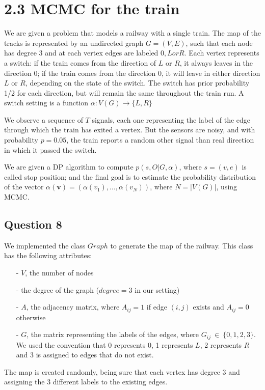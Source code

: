 \documentclass[]{article}
\begin{document}
\section*{2.3 MCMC for the train}
We are given a problem that models a railway with a single train. The map of the tracks is represented by an undirected graph $G=(V,E)$, such that each node has degree 3 and at each vertex edges are labeled $0, L or R$. Each vertex represents a switch: if the train comes from the direction of $L$ or $R$, it always leaves in the direction 0; if the train comes from the direction $0$, it will leave in either direction $L$ or $R$, depending on the state of the switch. The switch has prior probability 1/2 for each direction, but will remain the same throughout the train run. A switch setting is a function $\alpha : V(G) \rightarrow \{L,R\}$

We observe a sequence of $T$ signals, each one representing the label of the edge through which the train has exited a vertex. But the sensors are noisy, and with probability $p = 0.05$, the train reports a random other signal than real direction in which it passed the switch. 

We are given a DP algorithm to compute $p(s,O|G,\alpha)$, where $s=(v,e)$ is called stop position; and the final goal is to estimate the probability distribution of the vector $\alpha(\mathbf{v}) = (\alpha(v_1), ..., \alpha(v_N))$,  where $ N=|V(G)| $, using MCMC.

\subsection*{Question 8}
We implemented the class $Graph$ to generate the map of the railway. This class has the following attributes:
\begin{enumerate}
	\item[-] $V$, the number of nodes 
	\item[-] the degree of the graph ($degree=3$ in our setting) 
	\item[-] $A$, the adjacency matrix, where $A_{ij}=1$ if edge $(i,j)$ exists and $A_{ij}=0$ otherwise
	\item[-] $G$, the matrix representing the labels of the edges, where $G_{ij} \ \in \ \{ 0,1,2,3\} $. We used the convention that 0 represents 0, 1 represents $L$, 2 represents $R$ and 3 is assigned to edges that do not exist.
\end{enumerate} 
The map is created randomly, being sure that each vertex has degree 3 and assigning the 3 different labels to the existing edges.
\end{document}
